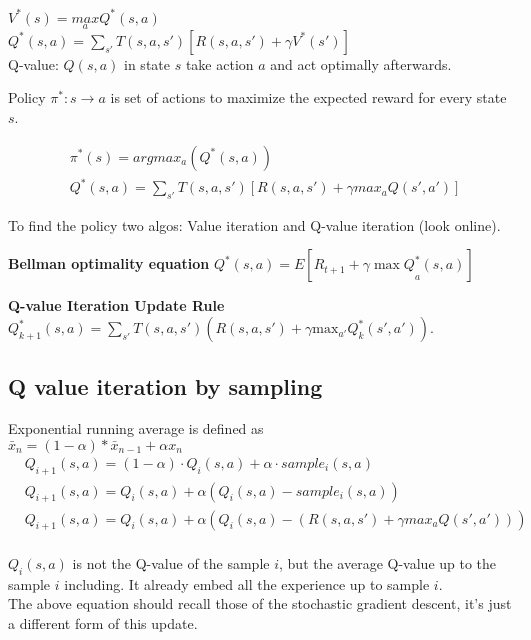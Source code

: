 $V^{*}(s) = \underset {a}{max}Q^{*}(s,a)$\\

$Q^{*}(s,a)=\sum _{s'}T(s,a,s')[R(s,a,s')+\gamma V^{*}(s')]$\\

Q-value: $Q(s,a)$ in state $s$ take action $a$ and act optimally afterwards. 

Policy $\pi^*: s \rightarrow a$ is set of actions to maximize the expected reward for every state $s$.

\begin{align*}
&\pi^*(s) = argmax_a(Q^*(s,a))\\
&Q^*(s,a)= \sum_{s'} T(s,a,s')[R(s,a,s') + \gamma max_{a}Q(s',a')]
\end{align*}

To find the policy two algos: Value iteration and Q-value iteration (look online).

\textbf{Bellman optimality equation}
$Q^*(s,a)=E[R_{t+1} + \gamma \underset{a}{\max{Q^*(s,a)}}]$

\textbf{Q-value Iteration Update Rule}\\
$Q_{k+1}^*(s, a) = \sum _{s'} T(s, a, s')(R(s, a, s') + \gamma \text {max}_{a'} Q_ k^*(s', a')).$



\subsection{Q value iteration by sampling}

Exponential running average is defined as\\
$\bar{x}_n = (1-\alpha)*\bar{x}_{n-1} + \alpha x_n$\\
\begin{align*}
&Q_{i+1}(s, a) = (1-\alpha)\cdot Q_{i}(s, a) + \alpha \cdot sample_i(s,a)\\
&Q_{i+1}(s, a) = Q_{i}(s, a) + \alpha (Q_{i}(s, a) - sample_i(s,a))\\
&Q_{i+1}(s, a) = Q_{i}(s, a) + \alpha (Q_{i}(s, a) - (R(s,a,s')
+ \gamma max_{a}Q(s',a')))
\end{align*}\\
$Q_{i}(s, a)$ is not the Q-value of the sample $i$, but the average Q-value up
to the sample $i$ including.  It already embed all the experience up to
sample $i$.\\
The above equation should recall those of the stochastic gradient descent,
it’s just a different form of this update.





